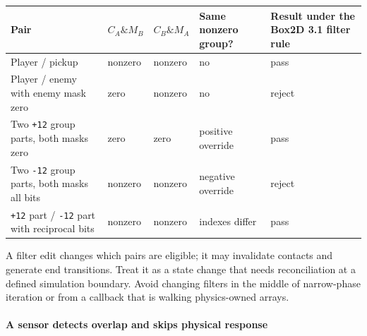 {\def\LTcaptype{none} %
\begin{longtable}[]{@{}
  >{\raggedright\arraybackslash}p{}
  >{\raggedleft\arraybackslash}p{}
  >{\raggedleft\arraybackslash}p{}
  >{\raggedright\arraybackslash}p{}
  >{\raggedright\arraybackslash}p{}@{}}
\toprule\noalign{}
\begin{minipage}[b]{\linewidth}\raggedright
Pair
\end{minipage} & \begin{minipage}[b]{\linewidth}\raggedleft
\(C_A \& M_B\)
\end{minipage} & \begin{minipage}[b]{\linewidth}\raggedleft
\(C_B \& M_A\)
\end{minipage} & \begin{minipage}[b]{\linewidth}\raggedright
Same nonzero group?
\end{minipage} & \begin{minipage}[b]{\linewidth}\raggedright
Result under the Box2D 3.1 filter rule
\end{minipage} \\
\midrule\noalign{}
\endhead
\bottomrule\noalign{}
\endlastfoot
Player / pickup & nonzero & nonzero & no & pass \\
Player / enemy with enemy mask zero & zero & nonzero & no & reject \\
Two \texttt{+12} group parts, both masks zero & zero & zero & positive override & pass \\
Two \texttt{-12} group parts, both masks all bits & nonzero & nonzero & negative override & reject \\
\texttt{+12} part / \texttt{-12} part with reciprocal bits & nonzero & nonzero & indexes differ & pass \\
\end{longtable}
}

A filter edit changes which pairs are eligible; it may invalidate contacts and generate end transitions. Treat it as a state change that needs reconciliation at a defined simulation boundary. Avoid changing filters in the middle of narrow-phase iteration or from a callback that is walking physics-owned arrays.

\paragraph{A sensor detects overlap and skips physical response}\label{a-sensor-detects-overlap-and-skips-physical-response}

